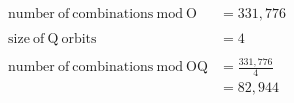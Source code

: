 \documentclass[preview, border=2mm]{standalone}
\begin{document}
\vspace*{\fill}

{\fontsize{32pt}{40pt}\selectfont
	\begin{align*}
		\mathrm{number\ of\ combinations\ mod\ O} &= 331,776 \\
		\\
		\mathrm{size\ of\ Q\ orbits} &= 4 \\
		\\
		\mathrm{number\ of\ combinations\ mod\ OQ} &= \frac{331,776}{4} \\
			&= 82,944
	\end{align*}
}

\vspace*{\fill}
\end{document}
